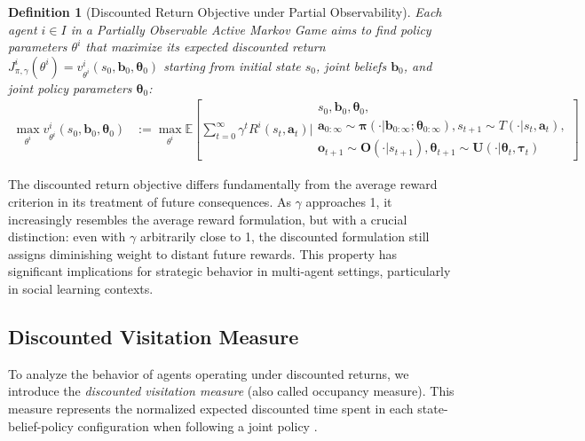 \documentclass[a4paper,12pt]{report}
\newtheorem{definition}{Definition}
\begin{document}
\begin{definition}[Discounted Return Objective under Partial Observability]
    Each agent $i \in I$ in a Partially Observable Active Markov Game aims to find policy parameters $\theta^i$ that maximize its expected discounted return $J^i_{\pi, \gamma}(\theta^i) = v^i_{\theta^i}(s_0, \boldsymbol{b}_0, \boldsymbol{\theta}_0)$ starting from initial state $s_0$, joint beliefs $\boldsymbol{b}_0$, and joint policy parameters $\boldsymbol{\theta}_0$:
    \begin{align}
        \max_{\theta^i} v^i_{\theta^i}(s_0, \boldsymbol{b}_0, \boldsymbol{\theta}_0) & := \max_{\theta^i} \mathbb{E}\left[ \sum_{t=0}^{\infty} \gamma^t R^i(s_t, \boldsymbol{a}_t) \bigg|
            \begin{array}{c}
                s_0, \boldsymbol{b}_0, \boldsymbol{\theta}_0, \\
                \boldsymbol{a}_{0:\infty} \sim \boldsymbol{\pi}(\cdot|\boldsymbol{b}_{0:\infty}; \boldsymbol{\theta}_{0:\infty}),
                s_{t+1} \sim T(\cdot|s_t, \boldsymbol{a}_t),  \\
                \boldsymbol{o}_{t+1} \sim \boldsymbol{O}(\cdot|s_{t+1}),
                \boldsymbol{\theta}_{t+1} \sim \boldsymbol{U}(\cdot|\boldsymbol{\theta}_t, \boldsymbol{\tau}_t)
            \end{array}
            \right]
    \end{align}

\end{definition}

The discounted return objective differs fundamentally from the average reward criterion in its treatment of future consequences. As $\gamma$ approaches 1, it increasingly resembles the average reward formulation, but with a crucial distinction: even with $\gamma$ arbitrarily close to 1, the discounted formulation still assigns diminishing weight to distant future rewards. This property has significant implications for strategic behavior in multi-agent settings, particularly in social learning contexts.

\subsection{Discounted Visitation Measure}

To analyze the behavior of agents operating under discounted returns, we introduce the \textit{discounted visitation measure} (also called occupancy measure). This measure represents the normalized expected discounted time spent in each state-belief-policy configuration when following a joint policy \citep{sutton1999policy, Silver2014DeterministicPG}.
\end{document}
